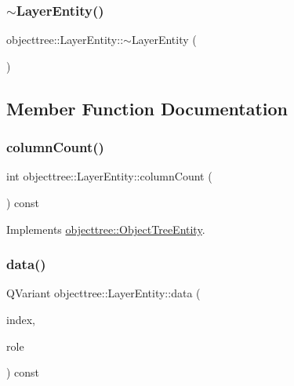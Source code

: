 \mbox{\label{classobjecttree_1_1_layer_entity_a233905520de9817b319a72ef2591f777}} 
\subsubsection{\texorpdfstring{$\sim$LayerEntity()}{~LayerEntity()}}
{\footnotesize\ttfamily objecttree\+::\+Layer\+Entity\+::$\sim$\+Layer\+Entity (\begin{DoxyParamCaption}{ }\end{DoxyParamCaption})\hspace{0.3cm}{\ttfamily [virtual]}}



\subsection{Member Function Documentation}
\mbox{\label{classobjecttree_1_1_layer_entity_a275f79511cd158727848d0bd255eba2b}} 
\subsubsection{\texorpdfstring{columnCount()}{columnCount()}}
{\footnotesize\ttfamily int objecttree\+::\+Layer\+Entity\+::column\+Count (\begin{DoxyParamCaption}{ }\end{DoxyParamCaption}) const\hspace{0.3cm}{\ttfamily [virtual]}}



Implements \mbox{\hyperlink{classobjecttree_1_1_object_tree_entity_a70fd25eccf88b305e9db15fbe3daeae8}{objecttree\+::\+Object\+Tree\+Entity}}.

\mbox{\label{classobjecttree_1_1_layer_entity_ae75ee051374a32aca57aa48f31365216}} 
\subsubsection{\texorpdfstring{data()}{data()}}
{\footnotesize\ttfamily Q\+Variant objecttree\+::\+Layer\+Entity\+::data (\begin{DoxyParamCaption}\item[{const Q\+Model\+Index \&}]{index,  }\item[{int}]{role }\end{DoxyParamCaption}) const\hspace{0.3cm}{\ttfamily [virtual]}}



